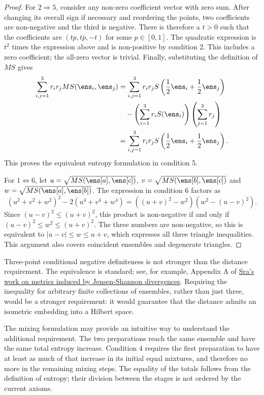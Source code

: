 \begin{proof}
	For $2\Rightarrow5$, consider any non-zero coefficient vector with zero sum. After changing its overall sign if necessary and reordering the points, two coefficients are non-negative and the third is negative. There is therefore a $t>0$ such that the coefficients are $(tp,t\bar{p},-t)$ for some $p\in[0,1]$. The quadratic expression is $t^2$ times the expression above and is non-positive by condition 2. This includes a zero coefficient; the all-zero vector is trivial. Finally, substituting the definition of $MS$ gives
	\begin{equation}
		\begin{aligned}
			\sum_{i,j=1}^3 r_i r_j MS(\ens_i,\ens_j)
			&=\sum_{i,j=1}^3 r_i r_j S\left(\frac{1}{2}\ens_i+\frac{1}{2}\ens_j\right)\\
			&\quad-\left(\sum_{i=1}^3 r_i S(\ens_i)\right)\left(\sum_{j=1}^3 r_j\right)\\
			&=\sum_{i,j=1}^3 r_i r_j S\left(\frac{1}{2}\ens_i+\frac{1}{2}\ens_j\right).
		\end{aligned}
	\end{equation}
	This proves the equivalent entropy formulation in condition 5.
	
	For $1\Leftrightarrow6$, let $u=\sqrt{MS(\ens[a],\ens[c])}$, $v=\sqrt{MS(\ens[b],\ens[c])}$ and $w=\sqrt{MS(\ens[a],\ens[b])}$. The expression in condition 6 factors as
	\begin{equation}
		(u^2+v^2+w^2)^2-2(u^4+v^4+w^4)
		=\left((u+v)^2-w^2\right)\left(w^2-(u-v)^2\right).
	\end{equation}
	Since $(u-v)^2\leq(u+v)^2$, this product is non-negative if and only if $(u-v)^2\leq w^2\leq(u+v)^2$. The three numbers are non-negative, so this is equivalent to $|u-v|\leq w\leq u+v$, which expresses all three triangle inequalities. This argument also covers coincident ensembles and degenerate triangles.
\end{proof}

Three-point conditional negative definiteness is not stronger than the distance requirement. The equivalence is standard; see, for example, Appendix A of \href{https://arxiv.org/pdf/1911.02643}{Sra's work on metrics induced by Jensen-Shannon divergences}. Requiring the inequality for arbitrary finite collections of ensembles, rather than just three, would be a stronger requirement: it would guarantee that the distance admits an isometric embedding into a Hilbert space.

The mixing formulation may provide an intuitive way to understand the additional requirement. The two preparations reach the same ensemble and have the same total entropy increase. Condition 4 requires the first preparation to have at least as much of that increase in its initial equal mixtures, and therefore no more in the remaining mixing steps. The equality of the totals follows from the definition of entropy; their division between the stages is not ordered by the current axioms.

